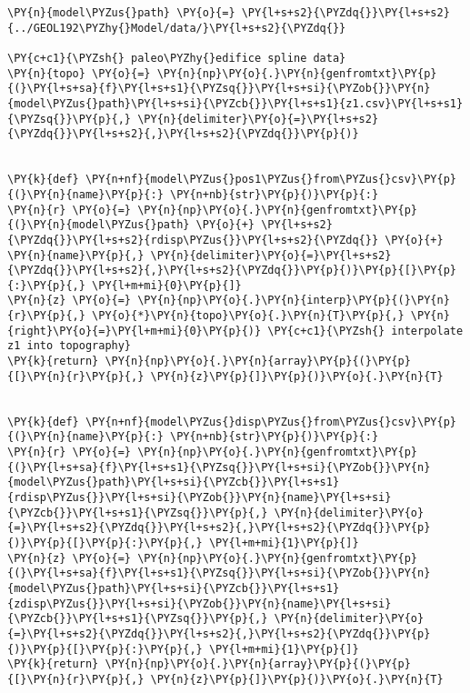 \begin{tcolorbox}[breakable, size=fbox, boxrule=1pt, pad at break*=1mm,colback=cellbackground, colframe=cellborder]
\begin{Verbatim}[commandchars=\\\{\}]
\PY{n}{model\PYZus{}path} \PY{o}{=} \PY{l+s+s2}{\PYZdq{}}\PY{l+s+s2}{../GEOL192\PYZhy{}Model/data/}\PY{l+s+s2}{\PYZdq{}}

\PY{c+c1}{\PYZsh{} paleo\PYZhy{}edifice spline data}
\PY{n}{topo} \PY{o}{=} \PY{n}{np}\PY{o}{.}\PY{n}{genfromtxt}\PY{p}{(}\PY{l+s+sa}{f}\PY{l+s+s1}{\PYZsq{}}\PY{l+s+si}{\PYZob{}}\PY{n}{model\PYZus{}path}\PY{l+s+si}{\PYZcb{}}\PY{l+s+s1}{z1.csv}\PY{l+s+s1}{\PYZsq{}}\PY{p}{,} \PY{n}{delimiter}\PY{o}{=}\PY{l+s+s2}{\PYZdq{}}\PY{l+s+s2}{,}\PY{l+s+s2}{\PYZdq{}}\PY{p}{)}


\PY{k}{def} \PY{n+nf}{model\PYZus{}pos1\PYZus{}from\PYZus{}csv}\PY{p}{(}\PY{n}{name}\PY{p}{:} \PY{n+nb}{str}\PY{p}{)}\PY{p}{:}
\PY{n}{r} \PY{o}{=} \PY{n}{np}\PY{o}{.}\PY{n}{genfromtxt}\PY{p}{(}\PY{n}{model\PYZus{}path} \PY{o}{+} \PY{l+s+s2}{\PYZdq{}}\PY{l+s+s2}{rdisp\PYZus{}}\PY{l+s+s2}{\PYZdq{}} \PY{o}{+} \PY{n}{name}\PY{p}{,} \PY{n}{delimiter}\PY{o}{=}\PY{l+s+s2}{\PYZdq{}}\PY{l+s+s2}{,}\PY{l+s+s2}{\PYZdq{}}\PY{p}{)}\PY{p}{[}\PY{p}{:}\PY{p}{,} \PY{l+m+mi}{0}\PY{p}{]}
\PY{n}{z} \PY{o}{=} \PY{n}{np}\PY{o}{.}\PY{n}{interp}\PY{p}{(}\PY{n}{r}\PY{p}{,} \PY{o}{*}\PY{n}{topo}\PY{o}{.}\PY{n}{T}\PY{p}{,} \PY{n}{right}\PY{o}{=}\PY{l+m+mi}{0}\PY{p}{)} \PY{c+c1}{\PYZsh{} interpolate z1 into topography}
\PY{k}{return} \PY{n}{np}\PY{o}{.}\PY{n}{array}\PY{p}{(}\PY{p}{[}\PY{n}{r}\PY{p}{,} \PY{n}{z}\PY{p}{]}\PY{p}{)}\PY{o}{.}\PY{n}{T}


\PY{k}{def} \PY{n+nf}{model\PYZus{}disp\PYZus{}from\PYZus{}csv}\PY{p}{(}\PY{n}{name}\PY{p}{:} \PY{n+nb}{str}\PY{p}{)}\PY{p}{:}
\PY{n}{r} \PY{o}{=} \PY{n}{np}\PY{o}{.}\PY{n}{genfromtxt}\PY{p}{(}\PY{l+s+sa}{f}\PY{l+s+s1}{\PYZsq{}}\PY{l+s+si}{\PYZob{}}\PY{n}{model\PYZus{}path}\PY{l+s+si}{\PYZcb{}}\PY{l+s+s1}{rdisp\PYZus{}}\PY{l+s+si}{\PYZob{}}\PY{n}{name}\PY{l+s+si}{\PYZcb{}}\PY{l+s+s1}{\PYZsq{}}\PY{p}{,} \PY{n}{delimiter}\PY{o}{=}\PY{l+s+s2}{\PYZdq{}}\PY{l+s+s2}{,}\PY{l+s+s2}{\PYZdq{}}\PY{p}{)}\PY{p}{[}\PY{p}{:}\PY{p}{,} \PY{l+m+mi}{1}\PY{p}{]}
\PY{n}{z} \PY{o}{=} \PY{n}{np}\PY{o}{.}\PY{n}{genfromtxt}\PY{p}{(}\PY{l+s+sa}{f}\PY{l+s+s1}{\PYZsq{}}\PY{l+s+si}{\PYZob{}}\PY{n}{model\PYZus{}path}\PY{l+s+si}{\PYZcb{}}\PY{l+s+s1}{zdisp\PYZus{}}\PY{l+s+si}{\PYZob{}}\PY{n}{name}\PY{l+s+si}{\PYZcb{}}\PY{l+s+s1}{\PYZsq{}}\PY{p}{,} \PY{n}{delimiter}\PY{o}{=}\PY{l+s+s2}{\PYZdq{}}\PY{l+s+s2}{,}\PY{l+s+s2}{\PYZdq{}}\PY{p}{)}\PY{p}{[}\PY{p}{:}\PY{p}{,} \PY{l+m+mi}{1}\PY{p}{]}
\PY{k}{return} \PY{n}{np}\PY{o}{.}\PY{n}{array}\PY{p}{(}\PY{p}{[}\PY{n}{r}\PY{p}{,} \PY{n}{z}\PY{p}{]}\PY{p}{)}\PY{o}{.}\PY{n}{T}
\end{Verbatim}
\end{tcolorbox}

